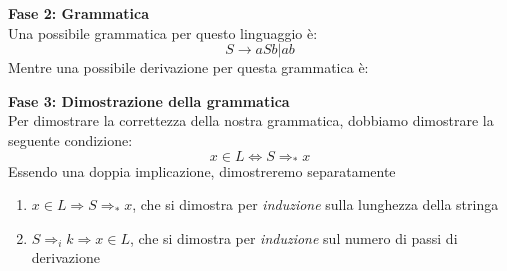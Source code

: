 \documentclass[a4paper,oneside]{scrbook}
\newcommand{\blue}[1]{\textcolor{blue}{#1}}
\begin{document}
\textbf{Fase 2: Grammatica}\\
Una possibile grammatica per questo linguaggio è:
$$S \rightarrow aSb|ab$$
Mentre una possibile derivazione per questa grammatica è:
\begin{center}
\end{center}
\textbf{Fase 3: Dimostrazione della grammatica}\\
Per dimostrare la correttezza della nostra grammatica, dobbiamo dimostrare la seguente condizione:
$$x\in L \Leftrightarrow S \Rightarrow_* x$$
Essendo una doppia implicazione, dimostreremo separatamente
\begin{enumerate}
	\item $x\in L \Rightarrow S \Rightarrow_* x $, che si dimostra per \textit{induzione} sulla lunghezza della stringa
	\item $ S \Rightarrow_i k \Rightarrow x \in L$, che si dimostra per \textit{induzione} sul numero di passi di derivazione
\end{enumerate}
\end{document}
